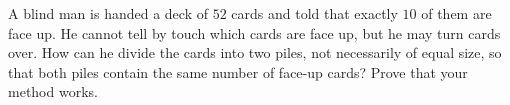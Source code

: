 A blind man is handed a deck of $52$ cards and told that exactly $10$ of them are face up. He cannot tell by touch which cards are face up, but he may turn cards over. How can he divide the cards into two piles, not necessarily of equal size, so that both piles contain the same number of face-up cards? Prove that your method works.
